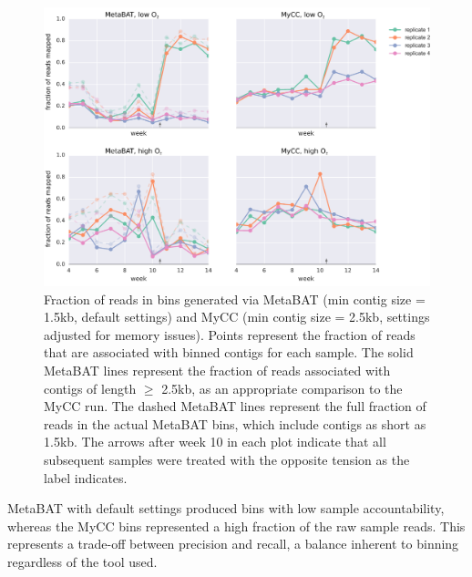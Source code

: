 \begin{figure}[H]
\centering
    \includegraphics[width=1.0\textwidth]{./tex/chapter2/figures/170201_comparable_read_coverage_for_metabat_and_mycc_3kb--INKSCAPED.pdf}
    \begin{singlespace}
    \caption[Fraction of reads in MetaBAT and MyCC bins]{
        Fraction of reads in bins generated via MetaBAT (min contig size = 1.5kb, default settings) and MyCC (min contig size = 2.5kb, settings adjusted for memory issues).
        Points represent the fraction of reads that are associated with binned contigs for each sample.
        The solid MetaBAT lines represent the fraction of reads associated with contigs of length $\geq$ 2.5kb, as an appropriate comparison to the MyCC run.
        The dashed MetaBAT lines represent the full fraction of reads in the actual MetaBAT bins, which include contigs as short as 1.5kb.
        The arrows after week 10 in each plot indicate that all subsequent samples were treated with the opposite  tension as the label indicates.
    }
    \label{fig:binning_frac_reads_mapped}
    \end{singlespace}
\end{figure}

MetaBAT with default settings produced bins with low sample accountability, whereas the MyCC bins represented a high fraction of the raw sample reads.
This represents a trade-off between precision and recall, a balance inherent to binning regardless of the tool used.

